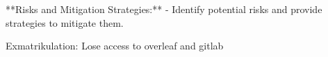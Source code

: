 **Risks and Mitigation Strategies:**
    - Identify potential risks and provide strategies to mitigate them.

Exmatrikulation: Lose access to overleaf and gitlab